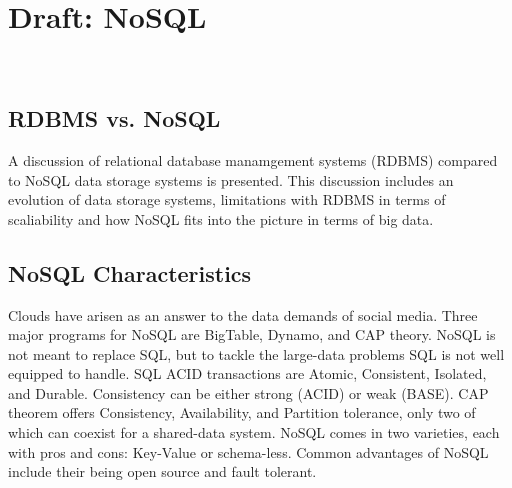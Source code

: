 \section{Draft: NoSQL}
\label{sec:icloud-nosql}

\FILENAME\


\subsection{RDBMS vs. NoSQL}

A discussion of relational database manamgement systems (RDBMS)
compared to NoSQL data storage systems is presented. This discussion
includes an evolution of data storage systems, limitations with RDBMS
in terms of scaliability and how NoSQL fits into the picture in terms
of big data. 
  



\subsection{NoSQL Characteristics}

Clouds have arisen as an answer to the data demands of social media.
Three major programs for NoSQL are BigTable, Dynamo, and CAP theory.
NoSQL is not meant to replace SQL, but to tackle the large-data problems
SQL is not well equipped to handle. SQL ACID transactions are Atomic,
Consistent, Isolated, and Durable. Consistency can be either strong
(ACID) or weak (BASE). CAP theorem offers Consistency, Availability, and
Partition tolerance, only two of which can coexist for a shared-data
system. NoSQL comes in two varieties, each with pros and cons: Key-Value
or schema-less. Common advantages of NoSQL include their being open
source and fault tolerant.




